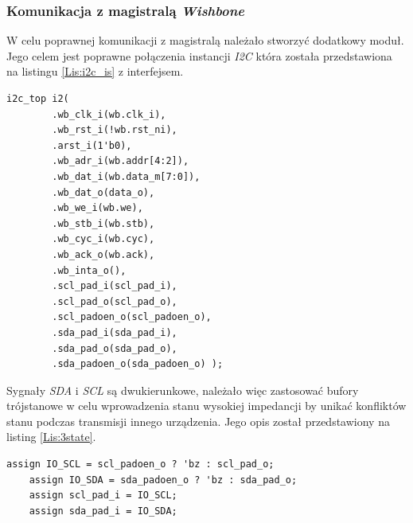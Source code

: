 \documentclass[11pt,a4paper]{article}
\begin{document}
		\subsubsection{Komunikacja z magistralą \textit{Wishbone}}
		W celu poprawnej komunikacji z magistralą należało stworzyć dodatkowy moduł. Jego celem jest poprawne połączenia instancji \textit{I2C} która została przedstawiona na listingu \ref{Lis:i2c_is} z interfejsem.\\
 			 \begin{minipage}{\textwidth}
\begin{scriptsize}
\begin{lstlisting}[label=Lis:i2c_is,caption=Bufor trójstanowy]
	i2c_top i2(
		.wb_clk_i(wb.clk_i),
		.wb_rst_i(!wb.rst_ni),
		.arst_i(1'b0),
		.wb_adr_i(wb.addr[4:2]),
		.wb_dat_i(wb.data_m[7:0]),
		.wb_dat_o(data_o),
		.wb_we_i(wb.we),
		.wb_stb_i(wb.stb),
		.wb_cyc_i(wb.cyc),
		.wb_ack_o(wb.ack),
		.wb_inta_o(),
		.scl_pad_i(scl_pad_i),
		.scl_pad_o(scl_pad_o),
		.scl_padoen_o(scl_padoen_o),
		.sda_pad_i(sda_pad_i),
		.sda_pad_o(sda_pad_o),
		.sda_padoen_o(sda_padoen_o)	);
\end{lstlisting}
\end{scriptsize}
\end{minipage}		
Sygnały \textit{SDA} i \textit{SCL} są dwukierunkowe, należało więc zastosować bufory trójstanowe w celu  wprowadzenia stanu wysokiej impedancji by unikać konfliktów stanu podczas transmisji innego urządzenia.  Jego opis został przedstawiony na listing \ref{Lis:3state}.\\
 			 \begin{minipage}{\textwidth}
\begin{scriptsize}
\begin{lstlisting}[label=Lis:3state,caption=Bufor trójstanowy]
	assign IO_SCL = scl_padoen_o ? 'bz : scl_pad_o;
	assign IO_SDA = sda_padoen_o ? 'bz : sda_pad_o;
	assign scl_pad_i = IO_SCL;
	assign sda_pad_i = IO_SDA;
\end{lstlisting}
\end{scriptsize}
\end{minipage}
\end{document}
